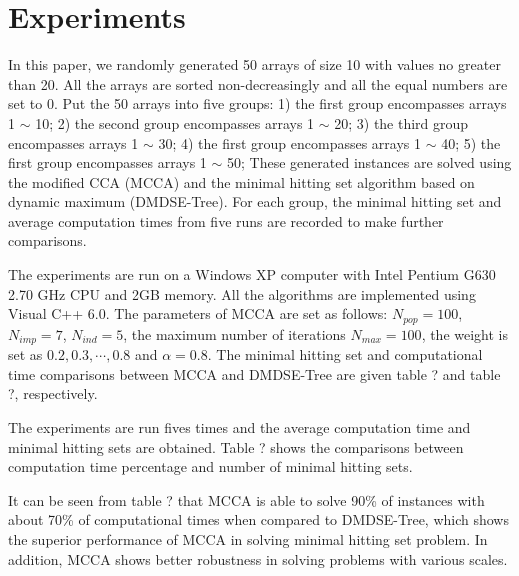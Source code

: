 \section{Experiments}
In this paper, we randomly generated 50 arrays of size 10 with values no greater than 20.
All the arrays are sorted non-decreasingly and all the equal numbers are set to 0.
Put the 50 arrays into five groups: 1) the first group encompasses arrays 1 $\sim$ 10; 2) the second group encompasses arrays 1 $\sim$ 20; 3) the third group encompasses arrays 1 $\sim$ 30; 4) the first group encompasses arrays 1 $\sim$ 40; 5) the first group encompasses arrays 1 $\sim$ 50;
These generated instances are solved using the modified CCA (MCCA) and the minimal hitting set algorithm based on dynamic maximum (DMDSE-Tree).
For each group, the minimal hitting set and average computation times from five runs are recorded to make further comparisons.

The experiments are run on a Windows XP computer with Intel Pentium G630 2.70 GHz CPU and 2GB memory.
All the algorithms are implemented using Visual C++ 6.0.
The parameters of MCCA are set as follows: $N_{pop} = 100$, $N_{imp} = 7$, $N_{ind}  = 5$, the maximum number of iterations $N_{max} = 100$, the weight is set as $0.2, 0.3, \cdots, 0.8$ and $\alpha = 0.8$.
The minimal hitting set and computational time comparisons between MCCA and DMDSE-Tree are given table ? and table ?, respectively.








The experiments are run fives times and the average computation time and minimal hitting sets are obtained.
Table ? shows the comparisons between computation time percentage and number of minimal hitting sets.



It can be seen from table ? that MCCA is able to solve 90\% of instances with about 70\% of computational times when compared to DMDSE-Tree, which shows the superior performance of MCCA in solving minimal hitting set problem.
In addition, MCCA shows better robustness in solving problems with various scales.